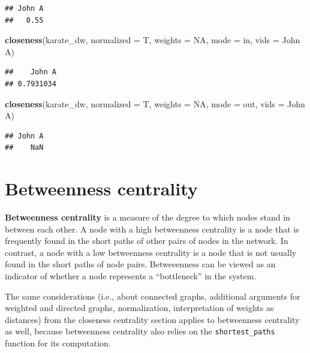 \documentclass[
]{book}
\newenvironment{Shaded}{\begin{snugshade}}{\end{snugshade}}
\newcommand{\AttributeTok}[1]{\textcolor[rgb]{0.13,0.29,0.53}{#1}}
\newcommand{\ConstantTok}[1]{\textcolor[rgb]{0.56,0.35,0.01}{#1}}
\newcommand{\FunctionTok}[1]{\textcolor[rgb]{0.13,0.29,0.53}{\textbf{#1}}}
\newcommand{\NormalTok}[1]{#1}
\newcommand{\StringTok}[1]{\textcolor[rgb]{0.31,0.60,0.02}{#1}}
\begin{document}
\begin{verbatim}
## John A 
##   0.55
\end{verbatim}

\begin{Shaded}
\begin{Highlighting}[]
\FunctionTok{closeness}\NormalTok{(karate\_dw, }\AttributeTok{normalized =}\NormalTok{ T, }\AttributeTok{weights =} \ConstantTok{NA}\NormalTok{, }\AttributeTok{mode =} \StringTok{\textquotesingle{}in\textquotesingle{}}\NormalTok{, }\AttributeTok{vids =} \StringTok{\textquotesingle{}John A\textquotesingle{}}\NormalTok{)}
\end{Highlighting}
\end{Shaded}

\begin{verbatim}
##    John A 
## 0.7931034
\end{verbatim}

\begin{Shaded}
\begin{Highlighting}[]
\FunctionTok{closeness}\NormalTok{(karate\_dw, }\AttributeTok{normalized =}\NormalTok{ T, }\AttributeTok{weights =} \ConstantTok{NA}\NormalTok{, }\AttributeTok{mode =} \StringTok{\textquotesingle{}out\textquotesingle{}}\NormalTok{, }\AttributeTok{vids =} \StringTok{\textquotesingle{}John A\textquotesingle{}}\NormalTok{)}
\end{Highlighting}
\end{Shaded}

\begin{verbatim}
## John A 
##    NaN
\end{verbatim}

\section{Betweenness centrality}\label{betweenness-centrality}

\textbf{Betweenness centrality} is a measure of the degree to which nodes stand in between each other. A node with a high betweenness centrality is a node that is frequently found in the short paths of other pairs of nodes in the network. In contrast, a node with a low betweenness centrality is a node that is not usually found in the short paths of node pairs. Betweeenness can be viewed as an indicator of whether a node represents a ``bottleneck'' in the system.

The same considerations (i.e., about connected graphs, additional arguments for weighted and directed graphs, normalization, interpretation of weights as distances) from the closeness centrality section applies to betweenness centrality as well, because betweenness centrality also relies on the \texttt{shortest\_paths} function for its computation.
\end{document}
